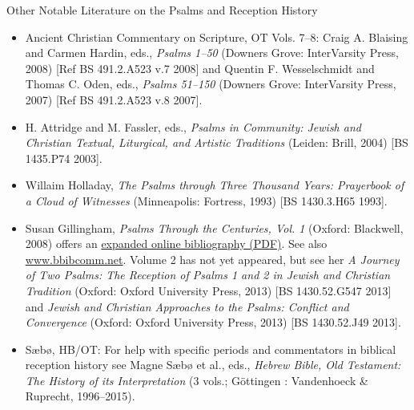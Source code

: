 \documentclass[titlepage]{article}
\begin{document}
\noindent Other Notable Literature on the Psalms and Reception History

\begin{itemize}

	\item Ancient Christian Commentary on Scripture, OT Vols. 7--8:
	  Craig A. Blaising and Carmen Hardin, eds., \emph{Psalms 1--50} (Downers Grove: InterVarsity Press, 2008) [Ref BS 491.2.A523 v.7 2008] and
	  Quentin F. Wesselschmidt and Thomas C. Oden, eds., \emph{Psalms 51--150} (Downers Grove: InterVarsity Press, 2007) [Ref BS 491.2.A523 v.8 2007].

	\item H. Attridge and M. Fassler, eds., \emph{Psalms in Community: Jewish and Christian Textual, Liturgical, and Artistic Traditions} (Leiden: Brill, 2004) [BS 1435.P74 2003].

	\item Willaim Holladay, \emph{The Psalms through Three Thousand Years: Prayerbook of a Cloud of Witnesses} (Minneapolis: Fortress, 1993) [BS 1430.3.H65 1993].

	\item Susan Gillingham, \emph{Psalms Through the Centuries, Vol. 1} (Oxford: Blackwell, 2008) offers an \href{http://www.blackwellpublishing.com/pdf/9780631218555.pdf}{expanded online bibliography (PDF)}. See also \href{http://www.bbibcomm.net/}{www.bbibcomm.net}. Volume 2 has not yet appeared, but see her \emph{A Journey of Two Psalms: The Reception of Psalms 1 and 2 in Jewish and Christian Tradition} (Oxford: Oxford University Press, 2013) [BS 1430.52.G547 2013] and \emph{Jewish and Christian Approaches to the Psalms: Conflict and Convergence} (Oxford: Oxford University Press, 2013) [BS 1430.52.J49 2013].

	\item Sæbø, HB/OT: For help with specific periods and commentators in biblical reception history see Magne Sæbø et al., eds., \emph{Hebrew Bible, Old Testament: The History of its Interpretation} (3 vols.; Göttingen : Vandenhoeck \& Ruprecht, 1996--2015).

\end{itemize}
\end{document}
